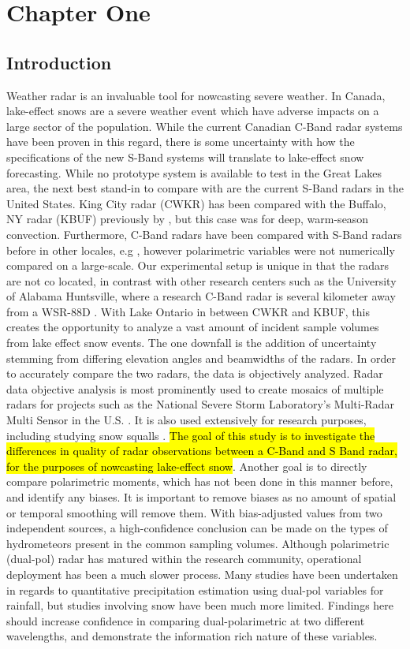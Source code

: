 \chapter{Chapter One}
\section{Introduction}
Weather radar is an invaluable tool for nowcasting severe weather. In Canada, lake-effect snows are a
severe weather event which have adverse impacts on a large
sector of the population. While the current Canadian C-Band radar systems have been proven in this
regard, there is some uncertainty with how the specifications of the new S-Band systems will translate to lake-effect snow forecasting. While no prototype
system is available to test in the Great Lakes area, the next best stand-in to compare with are the current
S-Band
radars in the United States. King City radar (CWKR) has been compared with the Buffalo, NY radar (KBUF)
previously by \cite{Boodoo2015}, but this case was for deep, warm-season convection. Furthermore, C-Band radars have been compared with S-Band radars before
in other locales, e.g \citep{Abon2014,
WMO2008}, however polarimetric variables were not numerically compared on a large-scale. Our experimental setup is unique in that the radars are not co
located, in contrast with other research centers such as the University of Alabama
Huntsville, where a research C-Band radar is several kilometer away from a WSR-88D
\citep{Petersen2007}. With Lake Ontario in between CWKR and KBUF, this creates the opportunity to analyze a vast amount of incident sample volumes from lake
effect snow events. The one downfall is the addition of uncertainty stemming from differing elevation angles and beamwidths of the radars. In order to
accurately compare the two
radars, the data is objectively analyzed. Radar data objective analysis is most prominently used to create
mosaics of multiple radars for projects such as the National Severe Storm Laboratory's Multi-Radar Multi
Sensor in the U.S. \citep{Zhang2016}. It is also used extensively for research purposes, including studying
snow squalls \citep{Mulholland2017}. \hl{The goal of this study is to investigate the differences in quality of radar observations between a C-Band and S
Band radar, for the purposes of
nowcasting lake-effect snow}. Another goal is to directly compare polarimetric moments,
which has not been done in this manner before, and
identify any biases. It is important to remove biases as no amount of spatial or temporal smoothing will
remove them. With bias-adjusted values from two independent sources, a high-confidence conclusion can
be made on the types of hydrometeors present in the common sampling volumes. Although polarimetric
(dual-pol) radar has matured within the research community, operational deployment has been a much
slower process. Many studies have been undertaken in regards to quantitative precipitation estimation
using dual-pol variables for rainfall, but studies involving snow have been much more limited. Findings here
should increase confidence in comparing dual-polarimetric at two different wavelengths, and demonstrate
the information rich nature of these variables. 
